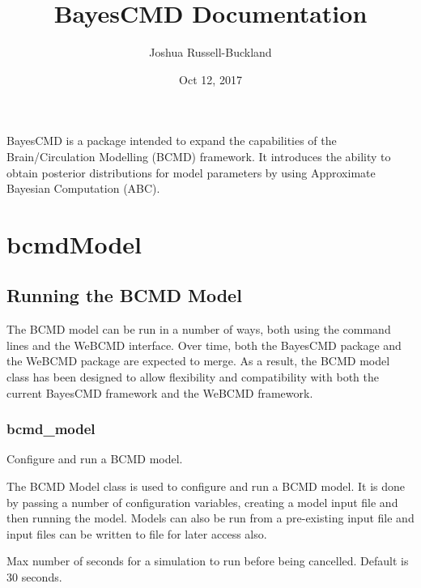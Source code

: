 \documentclass[letterpaper,10pt,english]{sphinxmanual}
\title{BayesCMD Documentation}
\date{Oct 12, 2017}
\author{Joshua Russell-Buckland}
\begin{document}
\maketitle
\sphinxtableofcontents
{}\label{\detokenize{index::doc}}


BayesCMD is a package intended to expand the capabilities of the
Brain/Circulation Modelling (BCMD) framework. It introduces the ability to
obtain posterior distributions for model parameters by using Approximate
Bayesian Computation (ABC).


\chapter{bcmdModel}
\label{\detokenize{bcmdModel::doc}}\label{\detokenize{bcmdModel:welcome-to-bayescmd-s-documentation}}\label{\detokenize{bcmdModel:bcmdmodel}}

\section{Running the BCMD Model}
\label{\detokenize{bcmdModel:running-the-bcmd-model}}
The BCMD model can be run in a number of ways, both using the command lines
and the WeBCMD interface. Over time, both the BayesCMD package and the WeBCMD
package are expected to merge. As a result, the BCMD model class has been
designed to allow flexibility and compatibility with both the current BayesCMD
framework and the WeBCMD framework.


\subsection{bcmd\_model}
\label{\detokenize{bcmdModel:bcmd-model}}\label{\detokenize{bcmdModel:module-bayescmd.bcmdModel.bcmd_model}}
Configure and run a BCMD model.

The BCMD Model class is used to configure and run a BCMD model. It is done by
passing a number of configuration variables, creating a model input file and
then running the model. Models can also be run from a pre-existing input file
and input files can be written to file for later access also.

\begin{fulllineitems}
\label{\detokenize{bcmdModel:bayescmd.bcmdModel.bcmd_model.TIMEOUT}}
 \textendash{} Max number of seconds for a simulation to run before being cancelled.
Default is 30 seconds.

\end{fulllineitems}
\end{document}
